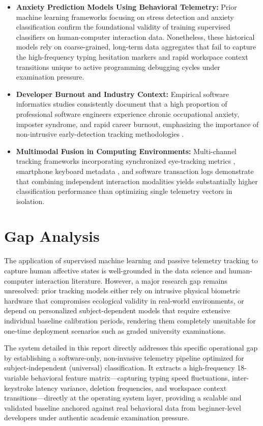\begin{itemize}
    \item \textbf{Anxiety Prediction Models Using Behavioral Telemetry:} Prior machine learning frameworks focusing on stress detection \cite{acm345697} and anxiety classification \cite{anxietyPrediction2023} confirm the foundational validity of training supervised classifiers on human-computer interaction data. Nonetheless, these historical models rely on coarse-grained, long-term data aggregates that fail to capture the high-frequency typing hesitation markers and rapid workspace context transitions unique to active programming debugging cycles under examination pressure.

    \item \textbf{Developer Burnout and Industry Context:} Empirical software informatics studies consistently document that a high proportion of professional software engineers experience chronic occupational anxiety, imposter syndrome, and rapid career burnout, emphasizing the importance of non-intrusive early-detection tracking methodologies \cite{mdpi5739, codereview2024}.

    \item \textbf{Multimodal Fusion in Computing Environments:} Multi-channel tracking frameworks incorporating synchronized eye-tracking metrics \cite{acm3507696, springer98414}, smartphone keyboard metadata \cite{keystroke2023}, and software transaction logs \cite{realtimeStress2012} demonstrate that combining independent interaction modalities yields substantially higher classification performance than optimizing single telemetry vectors in isolation.
\end{itemize}

\section{Gap Analysis}
The application of supervised machine learning and passive telemetry tracking to capture human affective states is well-grounded in the data science and human-computer interaction literature. However, a major research gap remains unresolved: prior tracking models either rely on intrusive physical biometric hardware that compromises ecological validity in real-world environments, or depend on personalized subject-dependent models that require extensive individual baseline calibration periods, rendering them completely unsuitable for one-time deployment scenarios such as graded university examinations.

\noindent The system detailed in this report directly addresses this specific operational gap by establishing a software-only, non-invasive telemetry pipeline optimized for subject-independent (universal) classification. It extracts a high-frequency 18-variable behavioral feature matrix---capturing typing speed fluctuations, inter-keystroke latency variance, deletion frequencies, and workspace context transitions---directly at the operating system layer, providing a scalable and validated baseline anchored against real behavioral data from beginner-level developers under authentic academic examination pressure.

